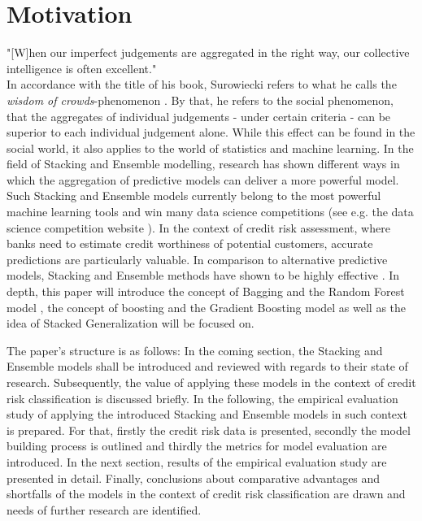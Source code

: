 \documentclass[12pt]{article}
\begin{document}
\section{Motivation}\label{Intro}
"[W]hen our imperfect judgements are aggregated in the right way, our collective intelligence is often excellent."\citep[Foreword p.XIV]{surowiecki2005wisdom}\\

In accordance with the title of his book, Surowiecki refers to what he calls the \textit{wisdom of crowds}-phenomenon \citep{surowiecki2005wisdom}. By that, he refers to the social phenomenon, that the aggregates of individual judgements - under certain criteria - can be superior to each individual judgement alone. While this effect can be found in the social world, it also applies to the world of statistics and machine learning. In the field of Stacking and Ensemble modelling, research has shown different ways in which the aggregation of predictive models can deliver a more powerful model. Such Stacking and Ensemble models currently belong to the most powerful machine learning tools and win many data science competitions (see e.g. the data science competition website \citeauthor{kaggle}). In the context of credit risk assessment, where banks need to estimate credit worthiness of potential customers, accurate predictions are particularly valuable. In comparison to alternative predictive models, Stacking and Ensemble methods have shown to be highly effective \citep{yu2008credit, zhu2017comparison}. In depth, this paper will introduce the concept of Bagging and the Random Forest model \citep{breiman1996bagging, breiman2001random}, the concept of boosting and the Gradient Boosting model \cite{freund1996experiments, friedman2002stochastic} as well as the idea of Stacked Generalization \citep{wolpert1992stacked} will be focused on. 

The paper's structure is as follows: In the coming section, the Stacking and Ensemble models shall be introduced and reviewed with regards to their state of research. Subsequently, the value of applying these models in the context of credit risk classification is discussed briefly. In the following, the empirical evaluation study of applying the introduced Stacking and Ensemble models in such context is prepared. For that, firstly the credit risk data is presented, secondly the model building process is outlined and thirdly the metrics for model evaluation are introduced. In the next section, results of the empirical evaluation study are presented in detail. Finally, conclusions about comparative advantages and shortfalls of the models in the context of credit risk classification are drawn and needs of further research are identified.
\end{document}
